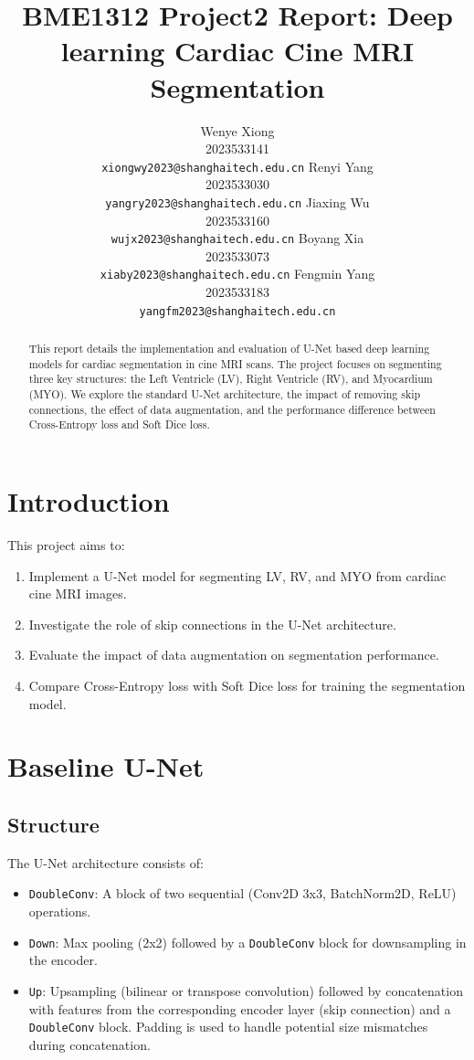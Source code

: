 \documentclass{article}
\title{BME1312 Project2 Report: Deep learning Cardiac Cine MRI Segmentation}
\author{%
  Wenye Xiong \\
  2023533141 \\
  \texttt{xiongwy2023@shanghaitech.edu.cn}
  \And
  Renyi Yang \\
  2023533030 \\
  \texttt{yangry2023@shanghaitech.edu.cn}
  \AND
  Jiaxing Wu \\
  2023533160 \\
  \texttt{wujx2023@shanghaitech.edu.cn}
  \And
  Boyang Xia \\
  2023533073 \\
  \texttt{xiaby2023@shanghaitech.edu.cn}
  \AND
  Fengmin Yang \\
  2023533183 \\
  \texttt{yangfm2023@shanghaitech.edu.cn}
}
\begin{document}
\maketitle


\begin{abstract}
  This report details the implementation and evaluation of U-Net based deep learning models for cardiac segmentation
  in cine MRI scans. The project focuses on segmenting three key structures: the Left Ventricle (LV), Right Ventricle (RV),
  and Myocardium (MYO). We explore the standard U-Net architecture, the impact of removing skip connections, the effect of
  data augmentation, and the performance difference between Cross-Entropy loss and Soft Dice loss.
\end{abstract}

\section{Introduction}
This project aims to:
\begin{enumerate}
  \item Implement a U-Net model for segmenting LV, RV, and MYO from cardiac cine MRI images.
  \item Investigate the role of skip connections in the U-Net architecture.
  \item Evaluate the impact of data augmentation on segmentation performance.
  \item Compare Cross-Entropy loss with Soft Dice loss for training the segmentation model.
\end{enumerate}



\section{Baseline U-Net}

\subsection{Structure}
The U-Net architecture consists of:
\begin{itemize}
  \item \texttt{DoubleConv}: A block of two sequential (Conv2D 3x3, BatchNorm2D, ReLU) operations.
  \item \texttt{Down}: Max pooling (2x2) followed by a \texttt{DoubleConv} block for downsampling in the encoder.
  \item \texttt{Up}: Upsampling (bilinear or transpose convolution) followed by concatenation with features from the
        corresponding encoder layer (skip connection) and a \texttt{DoubleConv} block. Padding is used to handle potential
        size mismatches during concatenation.
\end{itemize}
\end{document}
